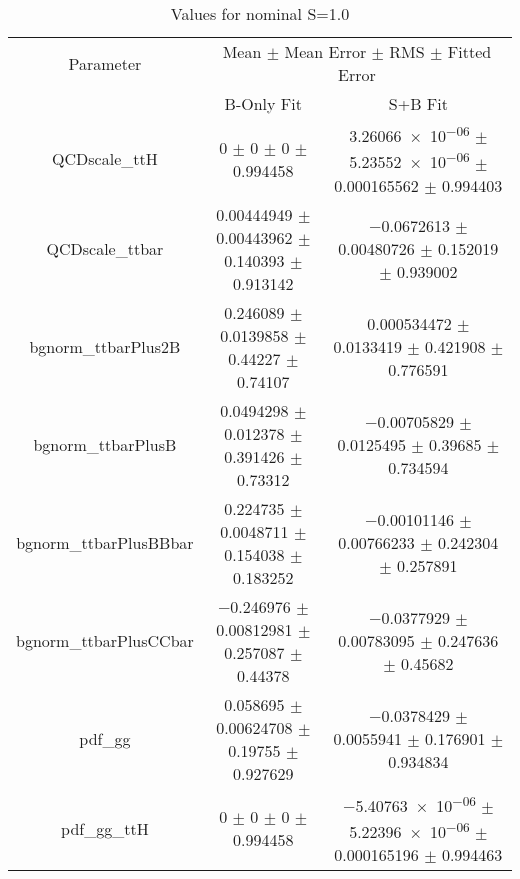 \begin{table}
\centering
\caption{Values for nominal S=1.0}
\begin{tabular}{ccc}
\toprule
Parameter & \multicolumn{2}{c}{Mean $\pm$ Mean Error $\pm$ RMS $\pm$ Fitted Error}\\
 & B-Only Fit & S+B Fit\\
\midrule
QCDscale\_ttH & \num{0} $\pm$ \num{0} $\pm$ \num{0} $\pm$ \num{0.994458} & \num{3.26066e-06} $\pm$ \num{5.23552e-06} $\pm$ \num{0.000165562} $\pm$ \num{0.994403}\\
QCDscale\_ttbar & \num{0.00444949} $\pm$ \num{0.00443962} $\pm$ \num{0.140393} $\pm$ \num{0.913142} & \num{-0.0672613} $\pm$ \num{0.00480726} $\pm$ \num{0.152019} $\pm$ \num{0.939002}\\
bgnorm\_ttbarPlus2B & \num{0.246089} $\pm$ \num{0.0139858} $\pm$ \num{0.44227} $\pm$ \num{0.74107} & \num{0.000534472} $\pm$ \num{0.0133419} $\pm$ \num{0.421908} $\pm$ \num{0.776591}\\
bgnorm\_ttbarPlusB & \num{0.0494298} $\pm$ \num{0.012378} $\pm$ \num{0.391426} $\pm$ \num{0.73312} & \num{-0.00705829} $\pm$ \num{0.0125495} $\pm$ \num{0.39685} $\pm$ \num{0.734594}\\
bgnorm\_ttbarPlusBBbar & \num{0.224735} $\pm$ \num{0.0048711} $\pm$ \num{0.154038} $\pm$ \num{0.183252} & \num{-0.00101146} $\pm$ \num{0.00766233} $\pm$ \num{0.242304} $\pm$ \num{0.257891}\\
bgnorm\_ttbarPlusCCbar & \num{-0.246976} $\pm$ \num{0.00812981} $\pm$ \num{0.257087} $\pm$ \num{0.44378} & \num{-0.0377929} $\pm$ \num{0.00783095} $\pm$ \num{0.247636} $\pm$ \num{0.45682}\\
pdf\_gg & \num{0.058695} $\pm$ \num{0.00624708} $\pm$ \num{0.19755} $\pm$ \num{0.927629} & \num{-0.0378429} $\pm$ \num{0.0055941} $\pm$ \num{0.176901} $\pm$ \num{0.934834}\\
pdf\_gg\_ttH & \num{0} $\pm$ \num{0} $\pm$ \num{0} $\pm$ \num{0.994458} & \num{-5.40763e-06} $\pm$ \num{5.22396e-06} $\pm$ \num{0.000165196} $\pm$ \num{0.994463}\\
\bottomrule
\end{tabular}
\end{table}